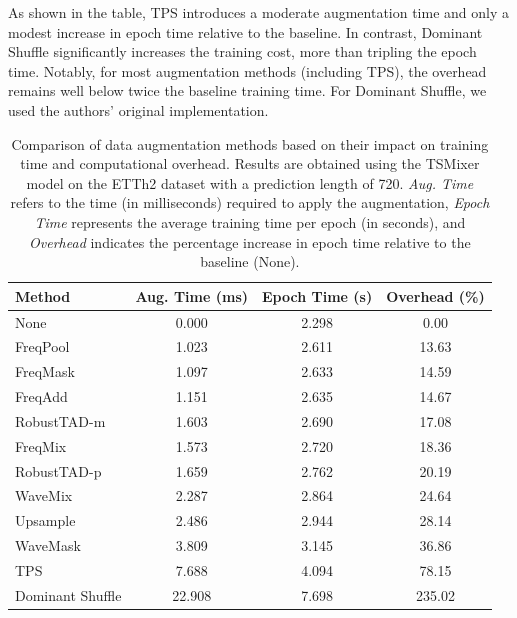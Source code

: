 As shown in the table, TPS introduces a moderate augmentation time and only a modest increase in epoch time relative to the baseline. In contrast, Dominant Shuffle significantly increases the training cost, more than tripling the epoch time. Notably, for most augmentation methods (including TPS), the overhead remains well below twice the baseline training time. For Dominant Shuffle, we used the authors’ original implementation.


\begin{table}[h!]
\centering
\footnotesize
\vspace{0.2cm}
\renewcommand{\arraystretch}{1.1}
\begin{tabular}{lccc}
    \toprule
    \textbf{Method} & \textbf{Aug. Time (ms)} & \textbf{Epoch Time (s)} & \textbf{Overhead (\%)} \\
    \midrule
    None  & 0.000 & 2.298 & 0.00 \\
    \midrule
    FreqPool        & 1.023 & 2.611 & 13.63 \\
    FreqMask        & 1.097 & 2.633 & 14.59 \\
    FreqAdd         & 1.151 & 2.635 & 14.67 \\
    RobustTAD-m     & 1.603 & 2.690 & 17.08 \\
    FreqMix         & 1.573 & 2.720 & 18.36 \\
    RobustTAD-p     & 1.659 & 2.762 & 20.19 \\
    WaveMix         & 2.287 & 2.864 & 24.64 \\
    Upsample        & 2.486 & 2.944 & 28.14 \\
    WaveMask        & 3.809 & 3.145 & 36.86 \\
    \midrule
    TPS            & 7.688  & 4.094 & 78.15 \\
    Dominant Shuffle    & 22.908 & 7.698 & 235.02 \\
    \bottomrule
\end{tabular}
\vspace{0.2cm}
\caption{Comparison of data augmentation methods based on their impact on training time and computational overhead. Results are obtained using the TSMixer model on the ETTh2 dataset with a prediction length of 720. \textit{Aug. Time} refers to the time (in milliseconds) required to apply the augmentation, \textit{Epoch Time} represents the average training time per epoch (in seconds), and \textit{Overhead} indicates the percentage increase in epoch time relative to the baseline (None).}
\label{tab:augmentation_comparison}
\end{table}


